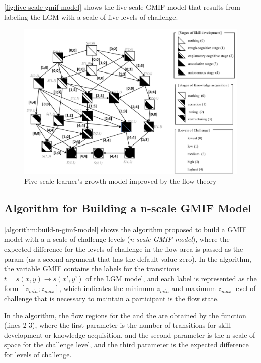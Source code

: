 \autoref{fig:five-scale-gmif-model} shows the five-scale GMIF model that results from labeling the LGM with a scale of five levels of challenge. 

 \begin{figure}[htb]
 \caption{Five-scale learner's growth model improved by the flow theory}
 \label{fig:five-scale-gmif-model}
 \centering
 \includegraphics[width=1\textwidth]{images/chap-model-gmif/five-scale-gmif-model.png}
 \fautor
\end{figure}

\newpage
\subsection{Algorithm for Building a n-scale GMIF Model}
\label{subsec:pseudo-algorithm-n-scale-gmifs}

\autoref{algorithm:build-n-gimf-model} shows the algorithm proposed to build a GMIF model with a n-scale of challenge levels (\emph{n-scale GMIF model}), where the expected difference for the levels of challenge in the flow area is passed as the param  (as a second argument that has the default value zero).
In the algorithm, the variable GMIF contains the labels for the transitions $t = s(x,y) \to s(x’,y’)$ of the LGM model, and each label is represented as the form $[z_{min}; z_{max}]$, which indicates the minimum $z_{min}$ and maximum $z_{max}$ level of challenge that is necessary to maintain a participant is the flow state.

In the algorithm, the flow regions for the  and the  are obtained by the function  (lines 2-3), where the first parameter is the number of transitions for skill development or knowledge acquisition, and the second parameter is the n-scale of space for the challenge level, and the third parameter is the expected difference for levels of challenge.


